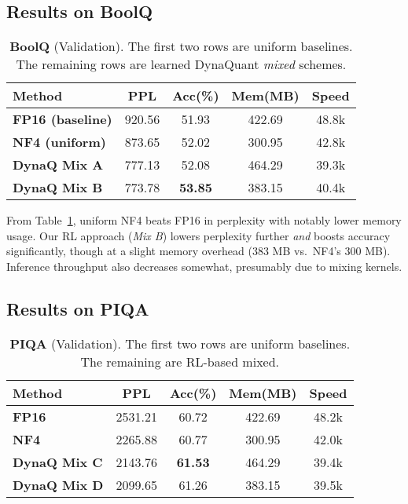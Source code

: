 \documentclass{article}
\begin{document}
	
	\subsection{Results on BoolQ}
	
	\begin{table}[ht]
		\centering
		\caption{\small \textbf{BoolQ} (Validation). The first two rows are uniform baselines. The remaining rows are learned DynaQuant \emph{mixed} schemes.}
		\label{tab:boolq}
		\begin{tabular}{lcccc}
			\toprule
			\textbf{Method} & \textbf{PPL} & \textbf{Acc(\%)} & \textbf{Mem(MB)} & \textbf{Speed}\\
			\midrule
			\textbf{FP16 (baseline)}  & 920.56 & 51.93 & 422.69 & 48.8k\\
			\textbf{NF4 (uniform)}    & 873.65 & 52.02 & 300.95 & 42.8k\\
			\midrule
			\textbf{DynaQ Mix A}  & 777.13 & 52.08 & 464.29 & 39.3k\\
			\textbf{DynaQ Mix B}  & 773.78 & \textbf{53.85} & 383.15 & 40.4k\\
			\bottomrule
		\end{tabular}
		\vspace{-1em}
	\end{table}
	
	From Table~\ref{tab:boolq}, uniform NF4 beats FP16 in perplexity with notably lower memory usage. Our RL approach (\emph{Mix B}) lowers perplexity further \emph{and} boosts accuracy significantly, though at a slight memory overhead (383 MB vs.\ NF4’s 300 MB). Inference throughput also decreases somewhat, presumably due to mixing kernels.
	
	\subsection{Results on PIQA}
	
	\begin{table}[ht]
		\centering
		\caption{\small \textbf{PIQA} (Validation). The first two rows are uniform baselines. The remaining are RL-based mixed.}
		\label{tab:piqa}
		\begin{tabular}{lcccc}
			\toprule
			\textbf{Method} & \textbf{PPL} & \textbf{Acc(\%)} & \textbf{Mem(MB)} & \textbf{Speed}\\
			\midrule
			\textbf{FP16}    & 2531.21 & 60.72 & 422.69 & 48.2k \\
			\textbf{NF4}     & 2265.88 & 60.77 & 300.95 & 42.0k \\
			\midrule
			\textbf{DynaQ Mix C} & 2143.76 & \textbf{61.53} & 464.29 & 39.4k \\
			\textbf{DynaQ Mix D} & 2099.65 & 61.26 & 383.15 & 39.5k \\
			\bottomrule
		\end{tabular}
		\vspace{-0.5em}
	\end{table}
	
\end{document}

